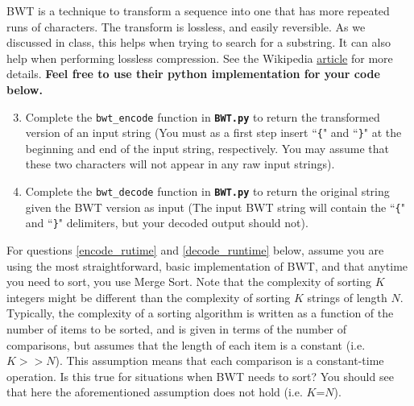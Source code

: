 BWT is a technique to transform a sequence into one that has more repeated runs of characters. The transform is lossless, and easily reversible. As we discussed in class, this helps when trying to search for a substring. It can also help when performing lossless compression. See the Wikipedia \href{https://en.wikipedia.org/wiki/Burrows–Wheeler_transform}{article} for more details. \textbf{Feel free to use their python implementation for your code below.}


\begin{enumerate}
  \setcounter{enumii}{2}
  \item Complete the \texttt{bwt\_encode} function in \textbf{\texttt{BWT.py}} to return the transformed version of an input string (You must as a first step insert ``\texttt{\{}" and ``\texttt{\}}" at the beginning and end of the input string, respectively. You may assume that these two characters will not appear in any raw input strings).
  \item Complete the \texttt{bwt\_decode} function in \textbf{\texttt{BWT.py}} to return the original string given the BWT version as input (The input BWT string will contain the ``\texttt{\{}" and ``\texttt{\}}" delimiters, but your decoded output should not).
\end{enumerate}

For questions \ref{encode_rutime} and \ref{decode_runtime} below, assume you are using the most straightforward, basic implementation of BWT, and that anytime you need to sort, you use Merge Sort. Note that the complexity of sorting $K$ integers might be different than the complexity of sorting $K$ strings of length $N$. Typically, the complexity of a sorting algorithm is written as a function of the number of items to be sorted, and is given in terms of the number of comparisons, but assumes that the length of each item is a constant (i.e. $K >> N$). This assumption means that each comparison is a constant-time operation. Is this true for situations when BWT needs to sort? You should see that here the aforementioned assumption does not hold (i.e. $K$=$N$).

